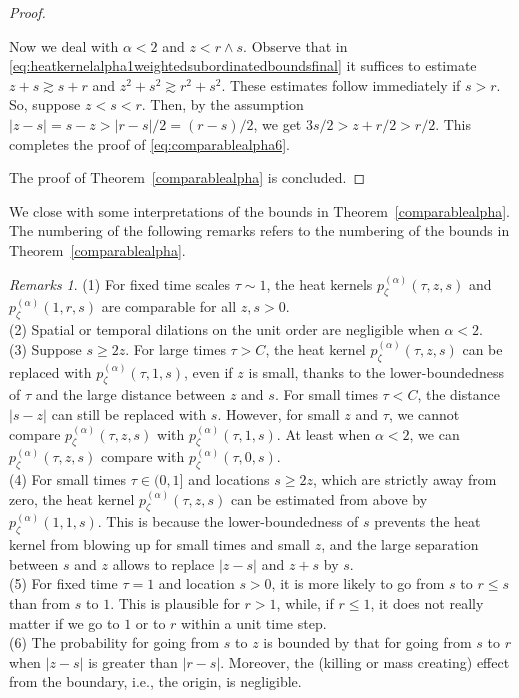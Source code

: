 \documentclass[12pt,reqno,a4paper]{amsart}
\theoremstyle{definition}
\theoremstyle{remark}
\newtheorem{remarks}[theorem]{Remarks}
\numberwithin{equation}{section}
\newcommand{\1}{\mathbbm{1}}
\begin{document}
\begin{proof}
\begin{enumerate}
    Now we deal with $\alpha<2$ and $z<r\wedge s$.
    Observe that in \eqref{eq:heatkernelalpha1weightedsubordinatedboundsfinal} it suffices to estimate $z+s\gtrsim s+r$ and $z^2+s^2\gtrsim r^2+s^2$. These estimates follow immediately if $s>r$. So, suppose $z<s<r$. Then, by the assumption $|z-s|=s-z>|r-s|/2=(r-s)/2$, we get $3s/2>z+r/2>r/2$. This completes the proof of \eqref{eq:comparablealpha6}.
  \end{enumerate}
  The proof of Theorem~\ref{comparablealpha} is concluded.
\end{proof}

We close with some interpretations of the bounds in Theorem~\ref{comparablealpha}. The numbering of the following remarks refers to the numbering of the bounds in Theorem~\ref{comparablealpha}.
\begin{remarks}
  (1) For fixed time scales $\tau\sim1$, the heat kernels $p_\zeta^{(\alpha)}(\tau,z,s)$ and $p_\zeta^{(\alpha)}(1,r,s)$ are comparable for all $z,s>0$.
  \\
  (2) Spatial or temporal dilations on the unit order are negligible when $\alpha<2$.
  \\
  (3) Suppose $s\geq2z$. For large times $\tau>C$, the heat kernel $p_\zeta^{(\alpha)}(\tau,z,s)$ can be replaced with $p_\zeta^{(\alpha)}(\tau,1,s)$, even if $z$ is small, thanks to the lower-boundedness of $\tau$ and the large distance between $z$ and $s$. For small times $\tau<C$, the distance $|s-z|$ can still be replaced with $s$. However, for small $z$ and $\tau$, we cannot compare $p_\zeta^{(\alpha)}(\tau,z,s)$ with $p_\zeta^{(\alpha)}(\tau,1,s)$. At least when $\alpha<2$, we can $p_\zeta^{(\alpha)}(\tau,z,s)$ compare with $p_\zeta^{(\alpha)}(\tau,0,s)$.
  \\
  (4) For small times $\tau\in(0,1]$ and locations $s\geq2z$, which are strictly away from zero, the heat kernel $p_\zeta^{(\alpha)}(\tau,z,s)$ can be estimated from above by $p_\zeta^{(\alpha)}(1,1,s)$. This is because the lower-boundedness of $s$ prevents the heat kernel from blowing up for small times and small $z$, and the large separation between $s$ and $z$ allows to replace $|z-s|$ and $z+s$ by $s$.
  \\
  (5) For fixed time $\tau=1$ and location $s>0$, it is more likely to go from $s$ to $r\leq s$ than from $s$ to $1$. This is plausible for $r>1$, while, if $r\leq1$, it does not really matter if we go to $1$ or to $r$ within a unit time step.
  \\
  (6) The probability for going from $s$ to $z$ is bounded by that for going from $s$ to $r$ when $|z-s|$ is greater than $|r-s|$. Moreover, the (killing or mass creating) effect from the boundary, i.e., the origin, is negligible.
\end{remarks}
\end{document}
